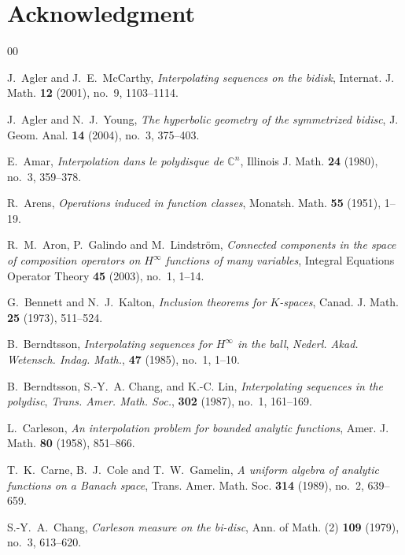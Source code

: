 \documentclass[preprint,12pt,number]{elsarticle}
\begin{document}
\section*{Acknowledgment}
\vspace{1cm}
\begin{thebibliography}{00}

J.~Agler and J.~E.~McCarthy,
\textit{Interpolating sequences on the bidisk},
Internat. J. Math. \textbf{12} (2001), no.~9, 1103--1114.

J.~Agler and N.~J.~Young,
\emph{The hyperbolic geometry of the symmetrized bidisc},
J. Geom. Anal. \textbf{14} (2004), no.~3, 375--403.

E.~Amar,
\textit{Interpolation dans le polydisque de $\mathbb{C}^n$},
Illinois J. Math. \textbf{24} (1980), no.~3, 359--378.

R.~Arens,
\textit{Operations induced in function classes},
Monatsh. Math. \textbf{55} (1951), 1--19.

R.~M.~Aron, P.~Galindo and M.~Lindström,
\textit{Connected components in the space of composition operators on $H^\infty$ functions of many variables},
Integral Equations Operator Theory \textbf{45} (2003), no.~1, 1--14.

G.~Bennett and N.~J.~Kalton, \emph{Inclusion theorems for $K$-spaces}, Canad. J. Math. \textbf{25} (1973), 511--524.

B.~Berndtsson,
\textit{Interpolating sequences for $H^\infty$ in the ball},
\textit{Nederl. Akad. Wetensch. Indag. Math.},
\textbf{47} (1985), no.~1, 1--10.

B.~Berndtsson, S.-Y.~A. Chang, and K.-C. Lin,
\textit{Interpolating sequences in the polydisc},
\textit{Trans. Amer. Math. Soc.},
\textbf{302} (1987), no.~1, 161--169.

L.~Carleson,
\textit{An interpolation problem for bounded analytic functions},
Amer. J. Math. \textbf{80} (1958), 851--866.

T.~K.~Carne, B.~J.~Cole and T.~W.~Gamelin,
\textit{A uniform algebra of analytic functions on a Banach space},
Trans. Amer. Math. Soc. \textbf{314} (1989), no.~2, 639--659.

S.-Y.~A.~Chang,
\textit{Carleson measure on the bi-disc},
Ann. of Math. (2) \textbf{109} (1979), no.~3, 613--620.


\end{thebibliography}
\end{document}
